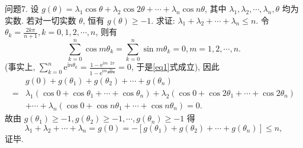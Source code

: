 问题7. 设 $g(\theta)=\lambda_1 \cos \theta+\lambda_2 \cos 2 \theta+\cdots+\lambda_n \cos n \theta$, 其中 $\lambda_1, \lambda_2, \cdots, \lambda_n, \theta$ 均为实数.
若对一切实数 $\theta$, 恒有 $g(\theta) \geqslant-1$. 求证: $\lambda_1+\lambda_2+\cdots+\lambda_n \leqslant n$.
令 $\theta_k=\frac{2 k \pi}{n+1}, k=0,1,2, \cdots, n$, 则有
$$
\sum_{k=0}^n \cos m \theta_k=\sum_{k=0}^n \sin m \theta_k=0, m=1,2, \cdots, n . \label{eq1}
$$
(事实上, $\sum_{k=0}^n \mathrm{e}^{\mathrm{i} n \theta_k}=\frac{1-\mathrm{e}^{\mathrm{i} m \cdot 2 \pi}}{1-\mathrm{e}^{\mathrm{i} m \frac{2 \pi}{n+1}}}=0$, 于是\ref{eq1}式成立), 因此
$$
\begin{aligned}
& g(0)+g\left(\theta_1\right)+g\left(\theta_2\right)+\cdots+g\left(\theta_n\right) \\
= & \lambda_1\left(\cos 0+\cos \theta_1+\cdots+\cos \theta_n\right)+\lambda_2\left(\cos 0+\cos 2 \theta_1+\cdots+\cos 2 \theta_n\right) \\
& +\cdots+\lambda_n\left(\cos 0+\cos n \theta_1+\cdots+\cos n \theta_n\right)=0 .
\end{aligned}
$$
故由 $g\left(\theta_1\right) \geqslant-1, g\left(\theta_2\right) \geqslant-1, \cdots, g\left(\theta_n\right) \geqslant-1$ 得
$$
\lambda_1+\lambda_2+\cdots+\lambda_n=g(0)=-\left[g\left(\theta_1\right)+g\left(\theta_2\right)+\cdots+g\left(\theta_n\right)\right] \leqslant n,
$$
证毕.


